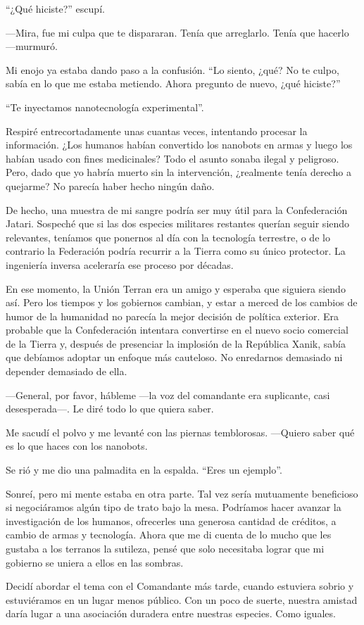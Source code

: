 ``¿Qué hiciste?'' escupí.

—Mira, fue mi culpa que te dispararan. Tenía que arreglarlo. Tenía que hacerlo —murmuró.

Mi enojo ya estaba dando paso a la confusión. ``Lo siento, ¿qué? No te culpo, sabía en lo que me estaba metiendo. Ahora pregunto de nuevo, ¿qué hiciste?''

``Te inyectamos nanotecnología experimental''.

Respiré entrecortadamente unas cuantas veces, intentando procesar la información. ¿Los humanos habían convertido los nanobots en armas y luego los habían usado con fines medicinales? Todo el asunto sonaba ilegal y peligroso. Pero, dado que yo habría muerto sin la intervención, ¿realmente tenía derecho a quejarme? No parecía haber hecho ningún daño.

De hecho, una muestra de mi sangre podría ser muy útil para la Confederación Jatari. Sospeché que si las dos especies militares restantes querían seguir siendo relevantes, teníamos que ponernos al día con la tecnología terrestre, o de lo contrario la Federación podría recurrir a la Tierra como su único protector. La ingeniería inversa aceleraría ese proceso por décadas.

En ese momento, la Unión Terran era un amigo y esperaba que siguiera siendo así. Pero los tiempos y los gobiernos cambian, y estar a merced de los cambios de humor de la humanidad no parecía la mejor decisión de política exterior. Era probable que la Confederación intentara convertirse en el nuevo socio comercial de la Tierra y, después de presenciar la implosión de la República Xanik, sabía que debíamos adoptar un enfoque más cauteloso. No enredarnos demasiado ni depender demasiado de ella.

—General, por favor, hábleme —la voz del comandante era suplicante, casi desesperada—. Le diré todo lo que quiera saber.

Me sacudí el polvo y me levanté con las piernas temblorosas. —Quiero saber qué es lo que haces con los nanobots.

Se rió y me dio una palmadita en la espalda. ``Eres un ejemplo''.

Sonreí, pero mi mente estaba en otra parte. Tal vez sería mutuamente beneficioso si negociáramos algún tipo de trato bajo la mesa. Podríamos hacer avanzar la investigación de los humanos, ofrecerles una generosa cantidad de créditos, a cambio de armas y tecnología. Ahora que me di cuenta de lo mucho que les gustaba a los terranos la sutileza, pensé que solo necesitaba lograr que mi gobierno se uniera a ellos en las sombras.

Decidí abordar el tema con el Comandante más tarde, cuando estuviera sobrio y estuviéramos en un lugar menos público. Con un poco de suerte, nuestra amistad daría lugar a una asociación duradera entre nuestras especies. Como iguales.